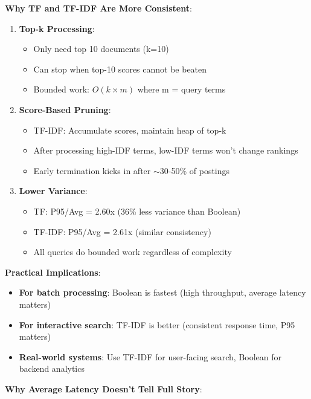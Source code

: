\documentclass[12pt,a4paper]{article}
\begin{document}
\textbf{Why TF and TF-IDF Are More Consistent}:

\begin{enumerate}
    \item \textbf{Top-k Processing}:
    \begin{itemize}
        \item Only need top 10 documents (k=10)
        \item Can stop when top-10 scores cannot be beaten
        \item Bounded work: $O(k \times m)$ where m = query terms
    \end{itemize}
    
    \item \textbf{Score-Based Pruning}:
    \begin{itemize}
        \item TF-IDF: Accumulate scores, maintain heap of top-k
        \item After processing high-IDF terms, low-IDF terms won't change rankings
        \item Early termination kicks in after $\sim$30-50\% of postings
    \end{itemize}
    
    \item \textbf{Lower Variance}:
    \begin{itemize}
        \item TF: P95/Avg = 2.60x (36\% less variance than Boolean)
        \item TF-IDF: P95/Avg = 2.61x (similar consistency)
        \item All queries do bounded work regardless of complexity
    \end{itemize}
\end{enumerate}

\textbf{Practical Implications}:

\begin{itemize}
    \item \textbf{For batch processing}: Boolean is fastest (high throughput, average latency matters)
    \item \textbf{For interactive search}: TF-IDF is better (consistent response time, P95 matters)
    \item \textbf{Real-world systems}: Use TF-IDF for user-facing search, Boolean for backend analytics
\end{itemize}

\textbf{Why Average Latency Doesn't Tell Full Story}:
\end{document}
